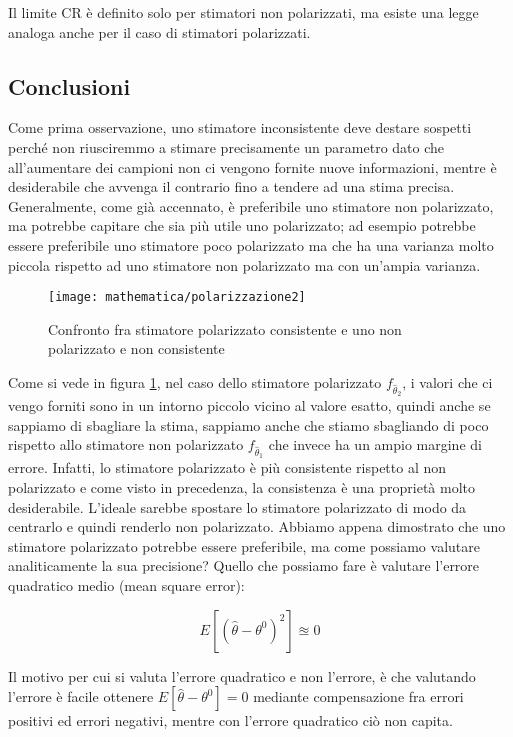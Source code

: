 Il limite CR è definito solo per stimatori non polarizzati, ma esiste una legge analoga anche per il caso di stimatori polarizzati.
\subsection{Conclusioni}
Come prima osservazione, uno stimatore inconsistente deve destare sospetti perché non riusciremmo a stimare precisamente un parametro dato che all'aumentare dei campioni non ci vengono fornite nuove informazioni, mentre è desiderabile che avvenga il contrario fino a tendere ad una stima precisa.\newline
Generalmente, come già accennato, è preferibile uno stimatore non polarizzato, ma potrebbe capitare che sia più utile uno polarizzato; ad esempio potrebbe essere preferibile uno stimatore poco polarizzato ma che ha una varianza molto piccola rispetto ad uno stimatore non polarizzato ma con un'ampia varianza.

\begin{figure}[htbp]
  \centering
  \texttt{[image: mathematica/polarizzazione2]}
  \caption{Confronto fra stimatore polarizzato consistente e uno non polarizzato e non consistente\label{fig:confrontopolarizzazioneconsistenza}}
\end{figure}

Come si vede in figura \ref{fig:confrontopolarizzazioneconsistenza}, nel caso dello stimatore polarizzato $f_{\hat{\theta}_2}$, i valori che ci vengo forniti sono in un intorno piccolo vicino al valore esatto, quindi anche se sappiamo di sbagliare la stima, sappiamo anche che stiamo sbagliando di poco rispetto allo stimatore non polarizzato $f_{\hat{\theta}_1}$ che invece ha un ampio margine di errore. Infatti, lo stimatore polarizzato è più consistente rispetto al non polarizzato e come visto in precedenza, la consistenza è una proprietà molto desiderabile. L'ideale sarebbe spostare lo stimatore polarizzato di modo da centrarlo e quindi renderlo non polarizzato.\newline
Abbiamo appena dimostrato che uno stimatore polarizzato potrebbe essere preferibile, ma come possiamo valutare analiticamente la sua precisione? Quello che possiamo fare è valutare l'errore quadratico medio (mean square error):

    \[ E[(\hat{\theta}-\theta^0)^2] \approxeq 0\]

Il motivo per cui si valuta l'errore quadratico e non l'errore, è che valutando l'errore è facile ottenere $E[\hat{\theta}-\theta^0]=0$ mediante compensazione fra errori positivi ed errori negativi, mentre con l'errore quadratico ciò non capita.

